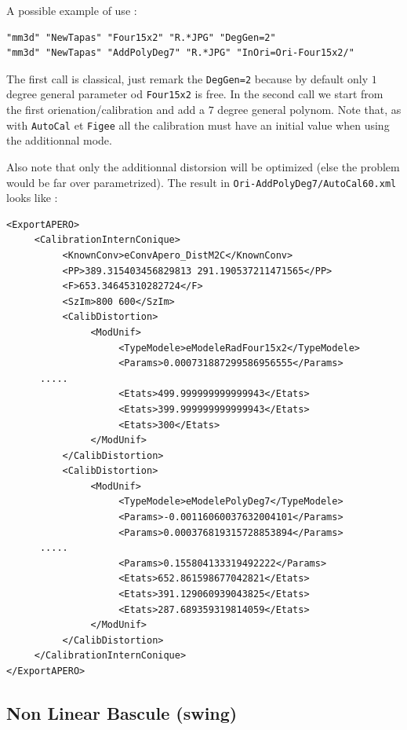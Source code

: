 A possible example of use :

\begin{verbatim}
"mm3d" "NewTapas" "Four15x2" "R.*JPG" "DegGen=2"
"mm3d" "NewTapas" "AddPolyDeg7" "R.*JPG" "InOri=Ori-Four15x2/"
\end{verbatim}

The first call is classical, just remark the {\tt DegGen=2} because by default only $1$ degree
general parameter od {\tt Four15x2} is free.  In the second call we start from the first orienation/calibration
and add a $7$ degree general polynom. Note that, as with {\tt AutoCal} et {\tt Figee} all the calibration must have
an initial value when using the additionnal mode. 

Also note that only the additionnal distorsion will be optimized (else the problem would be far over parametrized).
The result in {\tt Ori-AddPolyDeg7/AutoCal60.xml} looks like :

{\tiny
\begin{verbatim}
<ExportAPERO>
     <CalibrationInternConique>
          <KnownConv>eConvApero_DistM2C</KnownConv>
          <PP>389.315403456829813 291.190537211471565</PP>
          <F>653.34645310282724</F>
          <SzIm>800 600</SzIm>
          <CalibDistortion>
               <ModUnif>
                    <TypeModele>eModeleRadFour15x2</TypeModele>
                    <Params>0.000731887299586956555</Params>
      .....
                    <Etats>499.999999999999943</Etats>
                    <Etats>399.999999999999943</Etats>
                    <Etats>300</Etats>
               </ModUnif>
          </CalibDistortion>
          <CalibDistortion>
               <ModUnif>
                    <TypeModele>eModelePolyDeg7</TypeModele>
                    <Params>-0.00116060037632004101</Params>
                    <Params>0.000376819315728853894</Params>
      .....
                    <Params>0.155804133319492222</Params>
                    <Etats>652.861598677042821</Etats>
                    <Etats>391.129060939043825</Etats>
                    <Etats>287.689359319814059</Etats>
               </ModUnif>
          </CalibDistortion>
     </CalibrationInternConique>
</ExportAPERO>

\end{verbatim}
}


\subsection{Non Linear Bascule (swing)}


